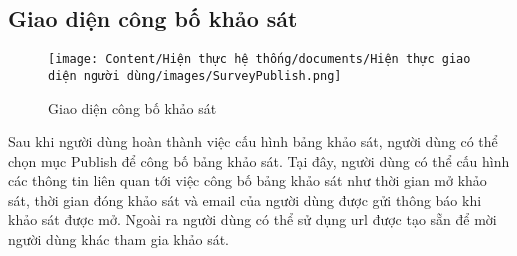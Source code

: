 \subsection{Giao diện công bố khảo sát}

\begin{figure}[H]
    \centering
    \texttt{[image: Content/Hiện thực hệ thống/documents/Hiện thực giao diện người dùng/images/SurveyPublish.png]}
    \vspace{0.5cm}
    \caption{Giao diện công bố khảo sát}
    \label{fig: Giao diện công bố khảo sát}
\end{figure}

Sau khi người dùng hoàn thành việc cấu hình bảng khảo sát, người dùng có thể chọn mục Publish để công bố bảng khảo sát. Tại đây, người dùng có thể cấu hình các thông tin liên quan tới việc công bố bảng khảo sát như thời gian mở khảo sát, thời gian đóng khảo sát và email của người dùng được gửi thông báo khi khảo sát được mở. Ngoài ra người dùng có thể sử dụng url được tạo sẵn để mời người dùng khác tham gia khảo sát.
